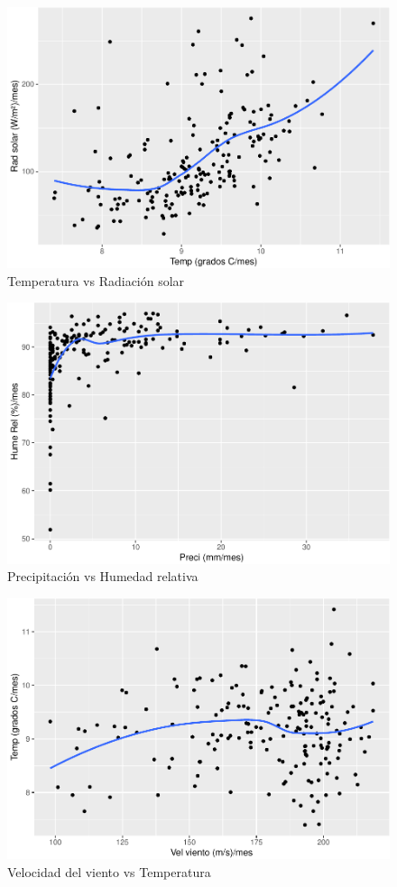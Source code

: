 \documentclass[conference,final,]{IEEEtran}
\makeatletter
\def\maxwidth{\ifdim\Gin@nat@width>\linewidth\linewidth
\else\Gin@nat@width\fi}
\let\Oldincludegraphics\includegraphics
\renewcommand{\includegraphics}[1]{\Oldincludegraphics[width=\maxwidth]{#1}}
\makeatother
\begin{document}
\begin{figure}
\centering
\includegraphics{Hidrology_files/figure-latex/unnamed-chunk-20-1.pdf}
\caption{Temperatura vs Radiación solar}
\end{figure}

\begin{figure}
\centering
\includegraphics{Hidrology_files/figure-latex/unnamed-chunk-21-1.pdf}
\caption{Precipitación vs Humedad relativa}
\end{figure}

\begin{figure}
\centering
\includegraphics{Hidrology_files/figure-latex/unnamed-chunk-22-1.pdf}
\caption{Velocidad del viento vs Temperatura}
\end{figure}
\end{document}
